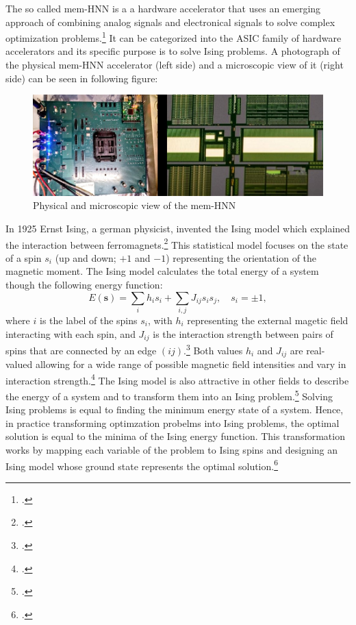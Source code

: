The so called \ac{mem-HNN} is a a hardware accelerator that uses an emerging approach of combining analog signals and electronical signals to solve complex optimization problems.\footcite[cf.][410]{caiPowerefficientCombinatorialOptimization2020}
It can be categorized into the \ac{ASIC} family of hardware accelerators and its specific purpose is to solve Ising problems. 
A photograph of the physical \ac{mem-HNN} accelerator (left side) and a microscopic view of it (right side) can be seen in following figure: 
\begin{figure}[H]
    \centering
    \includegraphics[width=0.65\linewidth]{graphics/Bilder_physische_beschleuniger.jpg}
    \caption{Physical and microscopic view of the mem-HNN}
\end{figure}
In 1925 Ernst Ising, a german physicist, invented the Ising model which explained the interaction between ferromagnets.\footcite[cf.][253-258]{isingBeitragZurTheorie1925}
This statistical model focuses on the state of a spin \( s_{i} \) (up and down; \( +1 \) and \( -1 \)) representing the orientation of the magnetic moment. 
The Ising model calculates the total energy of a system though the following energy function: 
\begin{equation}
    E(\mathbf{s}) = \sum_{i } h_i s_i + \sum_{i,j} J_{ij}s_{i}s_{j}, \quad s_i = \pm 1,
\end{equation}
where \( i \) is the label of the spins \( s_{i} \), with \( h_{i} \) representing the external magetic field  interacting with each spin, and \( J_{ij} \) is the interaction strength between pairs of spins that are connected by an edge \( (ij) \).\footcite[cf.][2]{tanahashiApplicationIsingMachines2019}
Both values \( h_{i} \) and  \( J_{ij} \) are real-valued allowing for a wide range of possible magnetic field intensities and vary in interaction strength.\footcite[cf.][1-2]{wangOscillatorbasedIsingMachine2017}
The Ising model is also attractive in other fields to describe the energy of a system and to transform them into an Ising problem.\footcite[cf.][2-3]{tanahashiApplicationIsingMachines2019}
Solving Ising problems is equal to finding the minimum energy state of a system.
Hence, in practice transforming optimzation probelms into Ising problems, the optimal solution is equal to the minima of the Ising energy function. 
This transformation works by mapping each variable of the problem to Ising spins and designing an Ising model whose ground state represents the optimal solution.\footcite[cf.][2-3]{lucasIsingFormulationsMany2014}

